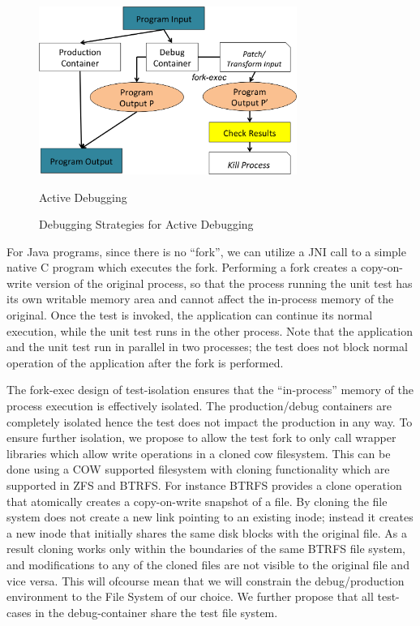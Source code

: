 \begin{figure}[h]
	\centering
	\includegraphics[width=0.75\textwidth]{guided/figs/active-debugging.png}
	\caption{Active Debugging}
	\label{fig:active-debugging}
	\caption{Debugging Strategies for Active Debugging}
\end{figure}

For Java programs, since there is no “fork”, we can utilize a JNI call to a simple native C program which executes the fork. 
Performing a fork creates a copy-on-write version of the original process, so that the process running the unit test has its own writable memory area and cannot affect the in-process memory of the original. 
Once the test is invoked, the application can continue its normal execution, while the unit test runs in the other process. 
Note that the application and the unit test run in parallel in two processes; the test does not block normal operation of the application after the fork is performed.

The fork-exec design of test-isolation ensures that the ``in-process'' memory of the process execution is effectively isolated. 
The production/debug containers are completely isolated hence the test does not impact the production in any way. 
To ensure further isolation, we propose to allow the test fork to only call wrapper libraries which allow write operations in a cloned cow filesystem.
This can be done using a COW supported filesystem with cloning functionality which are supported in ZFS and BTRFS.
For instance BTRFS provides a clone operation that atomically creates a copy-on-write snapshot of a file. By cloning the file system does not create a new link pointing to an existing inode; instead it creates a new inode that initially shares the same disk blocks with the original file. As a result cloning works only within the boundaries of the same BTRFS file system, and modifications to any of the cloned files are not visible to the original file and vice versa. 
This will ofcourse mean that we will constrain the debug/production environment to the File System of our choice.
We further propose that all test-cases in the debug-container share the test file system.